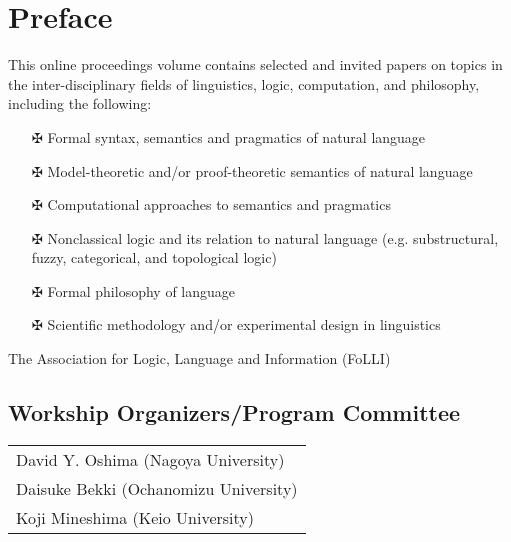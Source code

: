 \documentclass[12pt]{jarticle}
\begin{document}
\newpage

\vspace*{20cm}
\vfill
\begin{large}

\end{large}

\newpage
\pagestyle{plain}

\newpage
\section*{Preface}
This online proceedings volume contains selected and invited papers on topics in the inter-disciplinary fields of linguistics, logic, computation, and philosophy, including the following:
\begin{itemize}
\item[$\maltese$] Formal syntax, semantics and pragmatics of natural language
\item[$\maltese$] Model-theoretic and/or proof-theoretic semantics of natural language
\item[$\maltese$] Computational approaches to semantics and pragmatics
\item[$\maltese$] Nonclassical logic and its relation to natural language 
  (e.g. substructural, fuzzy, categorical, and topological logic)
\item[$\maltese$] Formal philosophy of language
\item[$\maltese$] Scientific methodology and/or experimental design in linguistics
\end{itemize}

The Association for Logic, Language and Information (FoLLI)

\subsection*{Workship Organizers/Program Committee}
\begin{flushleft}
\begin{tabular}{l}
David Y. Oshima (Nagoya University) \\
Daisuke Bekki (Ochanomizu University) \\
Koji Mineshima (Keio University) \\

\end{tabular}
\end{flushleft}
\newpage
  
  
\end{document}
